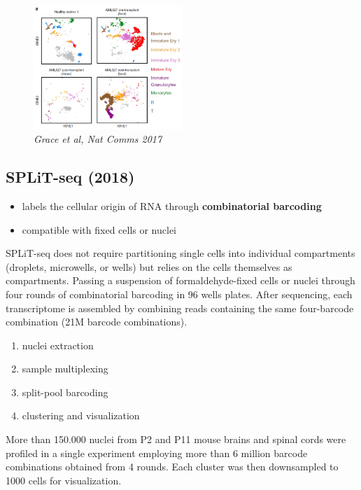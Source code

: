 \begin{figure}
\centering
\includegraphics[width=0.5\textwidth]{images/Screenshot_2023-03-24_at_08-16-37.png}
\caption{\emph{Grace et al, Nat Comms 2017}}
\end{figure}

\hypertarget{split-seq-2018}{%
\subsection{SPLiT-seq (2018)}\label{split-seq-2018}}

\begin{itemize}
\tightlist
\item
  labels the cellular origin of RNA through \textbf{combinatorial
  barcoding}
\item
  compatible with fixed cells or nuclei
\end{itemize}

SPLiT-seq does not require partitioning single cells into individual
compartments (droplets, microwells, or wells) but relies on the cells
themselves as compartments. Passing a suspension of formaldehyde-fixed
cells or nuclei through four rounds of combinatorial barcoding in 96
wells plates. After sequencing, each transcriptome is assembled by
combining reads containing the same four-barcode combination (21M
barcode combinations).

\begin{enumerate}
\def\labelenumi{\arabic{enumi}.}
\tightlist
\item
  nuclei extraction
\item
  sample multiplexing
\item
  split-pool barcoding
\item
  clustering and visualization
\end{enumerate}

More than 150.000 nuclei from P2 and P11 mouse brains and spinal cords
were profiled in a single experiment employing more than 6 million
barcode combinations obtained from 4 rounds. Each cluster was then
downsampled to 1000 cells for visualization.

